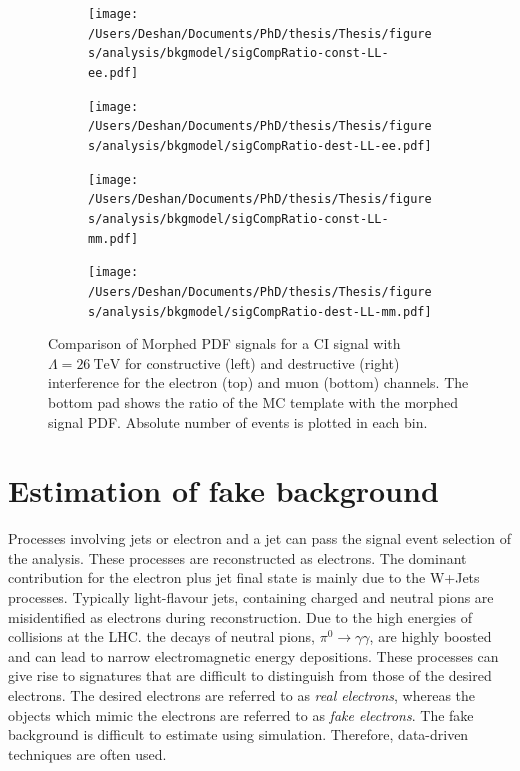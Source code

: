 \begin{figure}[h!]
    \centering
    \begin{subfigure}[b]{0.49\textwidth}
        \centering
        \texttt{[image: /Users/Deshan/Documents/PhD/thesis/Thesis/figures/analysis/bkgmodel/sigCompRatio-const-LL-ee.pdf]}
        \label{fig:bkgmodel:ratioMorphee1}
    \end{subfigure}
    \begin{subfigure}[b]{0.49\textwidth}
        \centering
        \texttt{[image: /Users/Deshan/Documents/PhD/thesis/Thesis/figures/analysis/bkgmodel/sigCompRatio-dest-LL-ee.pdf]}
        \label{fig:bkgmodel:ratioMorphee2}
    \end{subfigure}
    \begin{subfigure}[b]{0.49\textwidth}
        \centering
        \texttt{[image: /Users/Deshan/Documents/PhD/thesis/Thesis/figures/analysis/bkgmodel/sigCompRatio-const-LL-mm.pdf]}
        \label{fig:bkgmodel:ratioMorphmm1}
    \end{subfigure}
    \begin{subfigure}[b]{0.49\textwidth}
        \centering
        \texttt{[image: /Users/Deshan/Documents/PhD/thesis/Thesis/figures/analysis/bkgmodel/sigCompRatio-dest-LL-mm.pdf]}
        \label{fig:bkgmodel:ratioMorphmm2}
    \end{subfigure}
    \caption[Comparison of morphed signal PDF with generated signal template]{Comparison of Morphed PDF signals for a CI signal with $\Lambda = \SI{26}{\tera\electronvolt}$ for constructive (left) and destructive (right) interference for the electron (top) and muon (bottom) channels. The bottom pad shows the ratio of the MC template with the morphed signal PDF. Absolute number of events is plotted in each bin.}
    \label{fig:bkgmodel:ratioMorph}
\end{figure}

\section{Estimation of fake background}\label{sec:datamc:fakes}
Processes involving jets or electron and a jet can pass the signal event selection of the analysis. These processes are reconstructed as electrons. The dominant contribution for the electron plus jet final state is mainly due to the W+Jets processes. Typically light-flavour jets, containing charged and neutral pions are misidentified as electrons during reconstruction. Due to the high energies of collisions at the LHC. the decays of neutral pions, $\pi^0 \rightarrow \gamma\gamma$, are highly boosted and can lead to narrow electromagnetic energy depositions. These processes can give rise to signatures that are difficult to distinguish from those of the desired electrons. The desired electrons are referred to as \emph{real electrons}, whereas the objects which mimic the electrons are referred to as \emph{fake electrons}. The fake background is difficult to estimate using simulation. Therefore, data-driven techniques are often used. 

